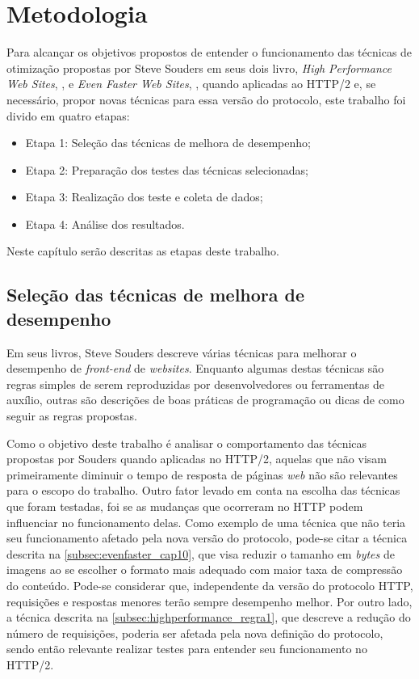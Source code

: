 %
%

\chapter{Metodologia}

Para alcançar os objetivos propostos de entender o funcionamento das técnicas de otimização propostas por Steve Souders em seus dois livro, \textit{High Performance Web Sites}, \cite{HighPerformance}, e \textit{Even Faster Web Sites}, \cite{EvenFaster}, quando aplicadas ao HTTP/2 e, se necessário, propor novas técnicas para essa versão do protocolo, este trabalho foi divido em quatro etapas:

\begin{itemize}
	\item Etapa 1: Seleção das técnicas de melhora de desempenho;
	\item Etapa 2: Preparação dos testes das técnicas selecionadas;
	\item Etapa 3: Realização dos teste e coleta de dados;
	\item Etapa 4: Análise dos resultados.
\end{itemize}

Neste capítulo serão descritas as etapas deste trabalho.

\section{Seleção das técnicas de melhora de desempenho}

Em seus livros, Steve Souders descreve várias técnicas para melhorar o desempenho de \textit{front-end} de \textit{websites}. Enquanto algumas destas técnicas são regras simples de serem reproduzidas por desenvolvedores ou ferramentas de auxílio, outras são descrições de boas práticas de programação ou dicas de como seguir as regras propostas.

Como o objetivo deste trabalho é analisar o comportamento das técnicas propostas por Souders quando aplicadas no HTTP/2, aquelas que não visam primeiramente diminuir o tempo de resposta de páginas \textit{web} não são relevantes para o escopo do trabalho. Outro fator levado em conta na escolha das técnicas que foram testadas, foi se as mudanças que ocorreram no HTTP podem influenciar no funcionamento delas. Como exemplo de uma técnica que não teria seu funcionamento afetado pela nova versão do protocolo, pode-se citar a técnica descrita na \autoref{subsec:evenfaster_cap10}, que visa reduzir o tamanho em \textit{bytes} de imagens ao se escolher o formato mais adequado com maior taxa de compressão do conteúdo. Pode-se considerar que, independente da versão do protocolo HTTP, requisições e respostas menores terão sempre desempenho melhor. Por outro lado, a técnica descrita na \autoref{subsec:highperformance_regra1}, que descreve a redução do número de requisições, poderia ser afetada pela nova definição do protocolo, sendo então relevante realizar testes para entender seu funcionamento no HTTP/2.

